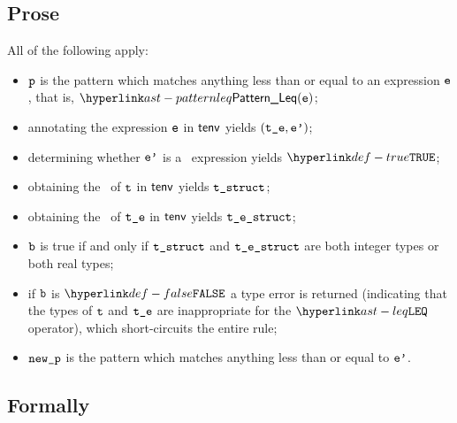 \subsection{Prose}
All of the following apply:
\begin{itemize}
\item $\vp$ is the pattern which matches anything less than or equal to an expression $\ve$,
that is, $\PatternLeq(\ve)$;
\item annotating the expression $\ve$ in $\tenv$ yields $(\vte, \vep)$\ProseOrTypeError;
\item determining whether $\vep$ is a \staticallyevaluable\ expression yields $\True$\ProseOrTypeError;
\item obtaining the \structure\ of $\vt$ in $\tenv$ yields $\vtstruct$\ProseOrTypeError;
\item obtaining the \structure\ of $\vte$ in $\tenv$ yields $\testruct$\ProseOrTypeError;
\item $\vb$ is true if and only if $\vtstruct$ and $\testruct$ are both integer types or both real types;
\item if $\vb$ is $\False$ a type error is returned (indicating that the types of $\vt$ and $\vte$
      are inappropriate for the $\LEQ$ operator),
which short-circuits the entire rule;
\item $\newp$ is the pattern which matches anything less than or equal to $\vep$.
\end{itemize}



\subsection{Formally}
\begin{mathpar}
\end{mathpar}

